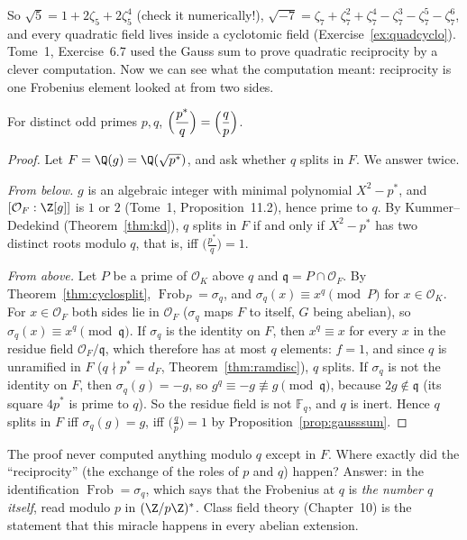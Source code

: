 So $\sqrt5=1+2\zeta_5+2\zeta_5^4$ (check it numerically!), $\sqrt{-7}=\zeta_7+\zeta_7^2+\zeta_7^4-\zeta_7^3-\zeta_7^5-\zeta_7^6$,
and every quadratic field lives inside a cyclotomic field (Exercise~\ref{ex:quadcyclo}). Tome~1, Exercise~6.7 used the Gauss
sum to prove quadratic reciprocity by a clever computation. Now we can see what the computation meant: reciprocity is one
Frobenius element looked at from two sides.

\begin{theorem}\label{thm:qrfrob}
For distinct odd primes $p,q$, $\displaystyle\Bigl(\frac{p^*}q\Bigr)=\Bigl(\frac qp\Bigr)$.
\end{theorem}
\begin{proof}
Let $F=\Q(g)=\Q(\sqrt{p^*})$, and ask whether $q$ splits in $F$. We answer twice.

\emph{From below.} $g$ is an algebraic integer with minimal polynomial $X^2-p^*$, and $[\mathcal O_F:\Z[g]]$ is $1$ or $2$
(Tome~1, Proposition~11.2), hence prime to $q$. By Kummer--Dedekind (Theorem~\ref{thm:kd}), $q$ splits in $F$ if and only if
$X^2-p^*$ has two distinct roots modulo $q$, that is, iff $\bigl(\frac{p^*}q\bigr)=1$.

\emph{From above.} Let $P$ be a prime of $\mathcal O_K$ above $q$ and $\mathfrak q=P\cap\mathcal O_F$. By
Theorem~\ref{thm:cyclosplit}, $\operatorname{Frob}_P=\sigma_q$, and $\sigma_q(x)\equiv x^q\pmod P$ for $x\in\mathcal O_K$.
For $x\in\mathcal O_F$ both sides lie in $\mathcal O_F$ ($\sigma_q$ maps $F$ to itself, $G$ being abelian), so
$\sigma_q(x)\equiv x^q\pmod{\mathfrak q}$. If $\sigma_q$ is the identity on $F$, then $x^q\equiv x$ for every $x$ in the
residue field $\mathcal O_F/\mathfrak q$, which therefore has at most $q$ elements: $f=1$, and since $q$ is unramified in $F$
($q\nmid p^*=d_F$, Theorem~\ref{thm:ramdisc}), $q$ splits. If $\sigma_q$ is not the identity on $F$, then $\sigma_q(g)=-g$,
so $g^q\equiv-g\not\equiv g\pmod{\mathfrak q}$, because $2g\notin\mathfrak q$ (its square $4p^*$ is prime to $q$). So the
residue field is not $\mathbb F_q$, and $q$ is inert. Hence $q$ splits in $F$ iff $\sigma_q(g)=g$, iff $\bigl(\frac qp\bigr)=1$ by
Proposition~\ref{prop:gausssum}.
\end{proof}

\begin{think}
The proof never computed anything modulo $q$ except in $F$. Where exactly did the ``reciprocity'' (the exchange of the roles
of $p$ and $q$) happen? Answer: in the identification $\operatorname{Frob}=\sigma_q$, which says that the Frobenius at $q$
is \emph{the number $q$ itself}, read modulo $p$ in $(\Z/p\Z)^*$. Class field theory (Chapter~10) is the statement that this
miracle happens in every abelian extension.
\end{think}


